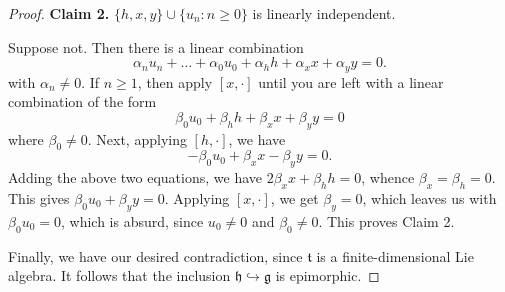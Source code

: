 \documentclass[12pt]{article}
\theoremstyle{thmstyle}
\theoremstyle{defstyle}
\newcommand{\frakg}{\mathfrak{g}}
\newcommand{\frakh}{\mathfrak{h}}
\newcommand{\frakt}{\mathfrak{t}}
\newcommand{\into}{\hookrightarrow}
\renewcommand{\ge}{\geqslant}
\begin{document}
\begin{proof}
    \noindent\textbf{Claim 2.} $\{h, x, y\}\cup\{u_n\colon n\ge 0\}$ is linearly independent.

    \noindent Suppose not. Then there is a linear combination 
    \begin{equation*}
        \alpha_n u_n + \dots + \alpha_0 u_0 + \alpha_h h + \alpha_x x + \alpha_y y = 0.
    \end{equation*}
    with $\alpha_n\ne 0$. If $n\ge 1$, then apply $[x,\cdot]$ until you are left with a linear combination of the form 
    \begin{equation*}
        \beta_0 u_0 + \beta_h h + \beta_x x + \beta_y y = 0
    \end{equation*}
    where $\beta_0\ne 0$. Next, applying $[h,\cdot]$, we have 
    \begin{equation*}
        -\beta_0 u_0 + \beta_x x - \beta_y y = 0.
    \end{equation*}
    Adding the above two equations, we have $2\beta_x x + \beta_h h = 0$, whence $\beta_x = \beta_h = 0$. This gives $\beta_0 u_0 + \beta_y y = 0$. Applying $[x, \cdot]$, we get $\beta_y = 0$, which leaves us with $\beta_0u_0 = 0$, which is absurd, since $u_0\ne 0$ and $\beta_0\ne 0$. This proves Claim 2.

    Finally, we have our desired contradiction, since $\frakt$ is a finite-dimensional Lie algebra. It follows that the inclusion $\frakh\into\frakg$ is epimorphic.
\end{proof}
\end{document}
